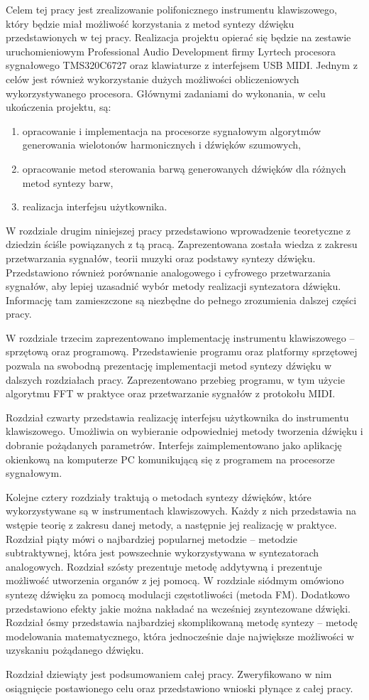 Celem tej pracy jest zrealizowanie polifonicznego instrumentu klawiszowego, który będzie miał możliwość korzystania z metod syntezy dźwięku przedstawionych w tej pracy. Realizacja projektu opierać się będzie na zestawie uruchomieniowym Professional Audio Development firmy Lyrtech procesora sygnałowego TMS320C6727 oraz klawiaturze z interfejsem USB MIDI. Jednym z celów jest również wykorzystanie dużych możliwości obliczeniowych wykorzystywanego procesora. Głównymi zadaniami do wykonania, w celu ukończenia projektu, są:

\begin{enumerate}
    \item opracowanie i implementacja na procesorze sygnałowym algorytmów generowania 	wielotonów harmonicznych i dźwięków szumowych,
    
    \item opracowanie metod sterowania barwą generowanych dźwięków dla różnych metod syntezy 	barw,
    
    \item realizacja interfejsu użytkownika.
\end{enumerate}

W rozdziale drugim niniejszej pracy przedstawiono wprowadzenie teoretyczne z dziedzin ściśle powiązanych z tą pracą. Zaprezentowana została wiedza z zakresu przetwarzania sygnałów, teorii muzyki oraz podstawy syntezy dźwięku. Przedstawiono również porównanie analogowego i cyfrowego przetwarzania sygnałów, aby lepiej uzasadnić wybór metody realizacji syntezatora dźwięku. Informację tam zamieszczone są niezbędne do pełnego zrozumienia dalszej części pracy.

W rozdziale trzecim zaprezentowano implementację instrumentu klawiszowego – sprzętową oraz programową. Przedstawienie programu oraz platformy sprzętowej pozwala na swobodną prezentację implementacji metod syntezy dźwięku w dalszych rozdziałach pracy. Zaprezentowano przebieg programu, w tym użycie algorytmu FFT w praktyce oraz przetwarzanie sygnałów z protokołu MIDI.

Rozdział czwarty przedstawia realizację interfejsu użytkownika do instrumentu klawiszowego. Umożliwia on wybieranie odpowiedniej metody tworzenia dźwięku i dobranie pożądanych parametrów. Interfejs zaimplementowano jako aplikację okienkową na komputerze PC komunikującą się z programem na procesorze sygnałowym.

Kolejne cztery rozdziały traktują o metodach syntezy dźwięków, które wykorzystywane są w instrumentach klawiszowych. Każdy z nich przedstawia na wstępie teorię z zakresu danej metody, a następnie jej realizację w praktyce. Rozdział piąty mówi o najbardziej popularnej metodzie – metodzie subtraktywnej, która jest powszechnie wykorzystywana w syntezatorach analogowych. Rozdział szósty prezentuje metodę addytywną i prezentuje możliwość utworzenia organów z jej pomocą. W rozdziale siódmym omówiono syntezę dźwięku za pomocą modulacji częstotliwości (metoda FM). Dodatkowo przedstawiono efekty jakie można nakładać na wcześniej zsyntezowane dźwięki. Rozdział ósmy przedstawia najbardziej skomplikowaną metodę syntezy – metodę modelowania matematycznego, która jednocześnie daje największe możliwości w uzyskaniu pożądanego dźwięku.

Rozdział dziewiąty jest podsumowaniem całej pracy. Zweryfikowano w nim osiągnięcie postawionego celu oraz przedstawiono wnioski płynące z całej pracy.